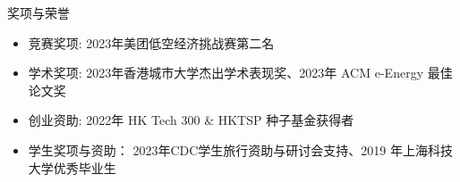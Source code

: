 \documentclass{resume} %
\begin{document}

\begin{rSection}{奖项与荣誉}

    \begin{itemize}
        \item 竞赛奖项: 2023年美团低空经济挑战赛第二名
        \item 学术奖项: 
        2023年香港城市大学杰出学术表现奖、2023年 ACM e-Energy 最佳论文奖
        \item 创业资助: 2022年 HK Tech 300 \& HKTSP 种子基金获得者
        \item 学生奖项与资助：
        2023年CDC学生旅行资助与研讨会支持、2019 年上海科技大学优秀毕业生

\end{itemize}
\end{rSection}
\end{document}
